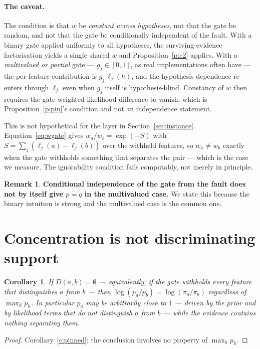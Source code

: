 \documentclass[11pt,a4paper]{article}
\newtheorem{corollary}[proposition]{Corollary}
\theoremstyle{definition}
\newtheorem{remark}{Remark}
\begin{document}
\paragraph{The caveat.} The condition is that $w$ be \emph{constant across
hypotheses}, not that the gate be random, and not that the gate be
conditionally independent of the fault. With a binary gate applied uniformly
to all hypotheses, the surviving-evidence factorisation yields a single shared
$w$ and Proposition~\ref{p:c2} applies. With a \emph{multivalued or partial}
gate --- $g_j\in[0,1]$, as real implementations often have --- the per-feature
contribution is $g_j\,\ell_j(h)$, and the hypothesis dependence re-enters
through $\ell_j$ even when $g_j$ itself is hypothesis-blind. Constancy of $w$
then requires the gate-weighted likelihood difference to vanish, which is
Proposition~\ref{p:pin}'s condition and not an independence statement.

This is not hypothetical for the layer in Section~\ref{sec:instance}.
Equation~\eqref{eq:wgate} gives $w_a/w_b=\exp(-S)$ with
$S=\sum_j(\ell_j(a)-\ell_j(b))$ over the withheld features, so $w_a\ne w_b$
exactly when the gate withholds something that separates the pair --- which is
the case we measure. The ignorability condition fails computably, not merely
in principle.

\begin{remark}
\textbf{Conditional independence of the gate from the fault does not by itself
give $p=q$ in the multivalued case.} We state this because the binary
intuition is strong and the multivalued case is the common one.
\end{remark}

\section{Concentration is not discriminating support}
\label{sec:support}

\begin{corollary}\label{c:support}
If $D(a,b)=\emptyset$ --- equivalently, if the gate withholds every feature
that distinguishes $a$ from $b$ --- then $\log(p_a/p_b)=\log(\pi_a/\pi_b)$
regardless of $\max_h p_h$. In particular $p_a$ may be arbitrarily close to
$1$ --- driven by the prior and by likelihood terms that do not distinguish
$a$ from $b$ --- while the evidence contains nothing separating them.
\end{corollary}
\begin{proof}
Corollary~\ref{c:pinned}; the conclusion involves no property of $\max_h p_h$.
\end{proof}
\end{document}

